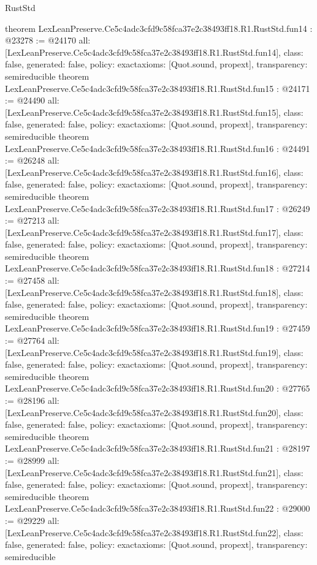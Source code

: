 \begin{lexlean}{RustStd}
\begin{coremodule}
{}
theorem LexLeanPreserve.Ce5c4adc3cfd9c58fca37e2c38493ff18.R1.RustStd.fun14 : @23278 := @24170 {
  all: [LexLeanPreserve.Ce5c4adc3cfd9c58fca37e2c38493ff18.R1.RustStd.fun14],
  class: false,
  generated: false,
  policy: exact{axioms: [Quot.sound, propext]},
  transparency: semireducible
}
theorem LexLeanPreserve.Ce5c4adc3cfd9c58fca37e2c38493ff18.R1.RustStd.fun15 : @24171 := @24490 {
  all: [LexLeanPreserve.Ce5c4adc3cfd9c58fca37e2c38493ff18.R1.RustStd.fun15],
  class: false,
  generated: false,
  policy: exact{axioms: [Quot.sound, propext]},
  transparency: semireducible
}
theorem LexLeanPreserve.Ce5c4adc3cfd9c58fca37e2c38493ff18.R1.RustStd.fun16 : @24491 := @26248 {
  all: [LexLeanPreserve.Ce5c4adc3cfd9c58fca37e2c38493ff18.R1.RustStd.fun16],
  class: false,
  generated: false,
  policy: exact{axioms: [Quot.sound, propext]},
  transparency: semireducible
}
theorem LexLeanPreserve.Ce5c4adc3cfd9c58fca37e2c38493ff18.R1.RustStd.fun17 : @26249 := @27213 {
  all: [LexLeanPreserve.Ce5c4adc3cfd9c58fca37e2c38493ff18.R1.RustStd.fun17],
  class: false,
  generated: false,
  policy: exact{axioms: [Quot.sound, propext]},
  transparency: semireducible
}
theorem LexLeanPreserve.Ce5c4adc3cfd9c58fca37e2c38493ff18.R1.RustStd.fun18 : @27214 := @27458 {
  all: [LexLeanPreserve.Ce5c4adc3cfd9c58fca37e2c38493ff18.R1.RustStd.fun18],
  class: false,
  generated: false,
  policy: exact{axioms: [Quot.sound, propext]},
  transparency: semireducible
}
theorem LexLeanPreserve.Ce5c4adc3cfd9c58fca37e2c38493ff18.R1.RustStd.fun19 : @27459 := @27764 {
  all: [LexLeanPreserve.Ce5c4adc3cfd9c58fca37e2c38493ff18.R1.RustStd.fun19],
  class: false,
  generated: false,
  policy: exact{axioms: [Quot.sound, propext]},
  transparency: semireducible
}
theorem LexLeanPreserve.Ce5c4adc3cfd9c58fca37e2c38493ff18.R1.RustStd.fun20 : @27765 := @28196 {
  all: [LexLeanPreserve.Ce5c4adc3cfd9c58fca37e2c38493ff18.R1.RustStd.fun20],
  class: false,
  generated: false,
  policy: exact{axioms: [Quot.sound, propext]},
  transparency: semireducible
}
theorem LexLeanPreserve.Ce5c4adc3cfd9c58fca37e2c38493ff18.R1.RustStd.fun21 : @28197 := @28999 {
  all: [LexLeanPreserve.Ce5c4adc3cfd9c58fca37e2c38493ff18.R1.RustStd.fun21],
  class: false,
  generated: false,
  policy: exact{axioms: [Quot.sound, propext]},
  transparency: semireducible
}
theorem LexLeanPreserve.Ce5c4adc3cfd9c58fca37e2c38493ff18.R1.RustStd.fun22 : @29000 := @29229 {
  all: [LexLeanPreserve.Ce5c4adc3cfd9c58fca37e2c38493ff18.R1.RustStd.fun22],
  class: false,
  generated: false,
  policy: exact{axioms: [Quot.sound, propext]},
  transparency: semireducible
}
\end{coremodule}
\end{lexlean}

